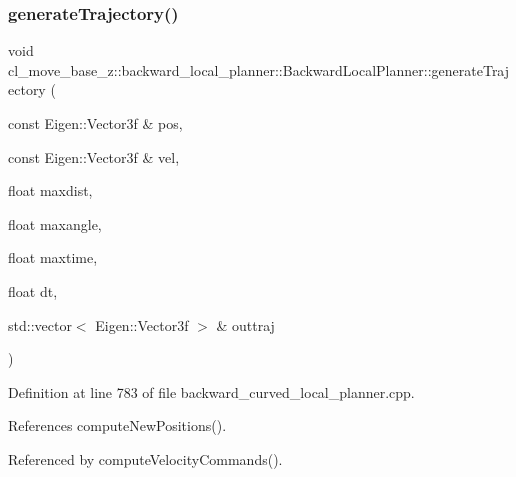 \subsubsection{\texorpdfstring{generate\+Trajectory()}{generateTrajectory()}}
{\footnotesize\ttfamily void cl\+\_\+move\+\_\+base\+\_\+z\+::backward\+\_\+local\+\_\+planner\+::\+Backward\+Local\+Planner\+::generate\+Trajectory (\begin{DoxyParamCaption}\item[{const Eigen\+::\+Vector3f \&}]{pos,  }\item[{const Eigen\+::\+Vector3f \&}]{vel,  }\item[{float}]{maxdist,  }\item[{float}]{maxangle,  }\item[{float}]{maxtime,  }\item[{float}]{dt,  }\item[{std\+::vector$<$ Eigen\+::\+Vector3f $>$ \&}]{outtraj }\end{DoxyParamCaption})\hspace{0.3cm}{\ttfamily [private]}}



Definition at line 783 of file backward\+\_\+curved\+\_\+local\+\_\+planner.\+cpp.



References compute\+New\+Positions().



Referenced by compute\+Velocity\+Commands().


